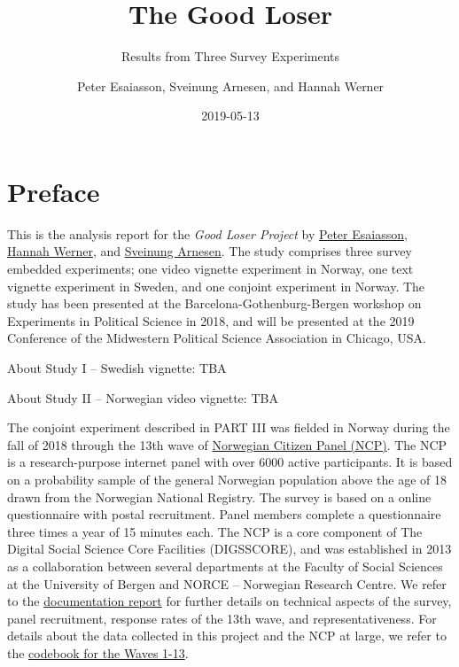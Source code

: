 \documentclass[]{book}
\title{The Good Loser}
\subtitle{Results from Three Survey Experiments}
\author{Peter Esaiasson, Sveinung Arnesen, and Hannah Werner}
\date{2019-05-13}
\begin{document}
\maketitle

{
\hypersetup{linkcolor=black}
\setcounter{tocdepth}{1}
\tableofcontents
}
\chapter{Preface}\label{preface}

This is the analysis report for the \emph{Good Loser Project} by
\href{https://www.gu.se/omuniversitetet/personal/?userId=xesape}{Peter
Esaiasson},
\href{http://www.uva.nl/profiel/w/e/h.i.werner/h.i.werner.html}{Hannah
Werner}, and \href{http://frosty-bose-c7f82c.netlify.com/}{Sveinung
Arnesen}. The study comprises three survey embedded experiments; one
video vignette experiment in Norway, one text vignette experiment in
Sweden, and one conjoint experiment in Norway. The study has been
presented at the Barcelona-Gothenburg-Bergen workshop on Experiments in
Political Science in 2018, and will be presented at the 2019 Conference
of the Midwestern Political Science Association in Chicago, USA.

About Study I -- Swedish vignette: TBA

About Study II -- Norwegian video vignette: TBA

The conjoint experiment described in PART III was fielded in Norway
during the fall of 2018 through the 13th wave of
\href{https://www.uib.no/medborger}{Norwegian Citizen Panel (NCP)}. The
NCP is a research-purpose internet panel with over 6000 active
participants. It is based on a probability sample of the general
Norwegian population above the age of 18 drawn from the Norwegian
National Registry. The survey is based on a online questionnaire with
postal recruitment. Panel members complete a questionnaire three times a
year of 15 minutes each. The NCP is a core component of The Digital
Social Science Core Facilities (DIGSSCORE), and was established in 2013
as a collaboration between several departments at the Faculty of Social
Sciences at the University of Bergen and NORCE -- Norwegian Research
Centre. We refer to the
\href{Data/ncp-wave13-documentation.pdf}{documentation report} for
further details on technical aspects of the survey, panel recruitment,
response rates of the 13th wave, and representativeness. For details
about the data collected in this project and the NCP at large, we refer
to the \href{Data/ncp-wave13-codebook.pdf}{codebook for the Waves 1-13}.
\end{document}
